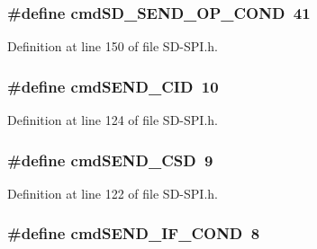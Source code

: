 \subsubsection[{cmd\+S\+D\+\_\+\+S\+E\+N\+D\+\_\+\+O\+P\+\_\+\+C\+O\+N\+D}]{\setlength{\rightskip}{0pt plus 5cm}\#define cmd\+S\+D\+\_\+\+S\+E\+N\+D\+\_\+\+O\+P\+\_\+\+C\+O\+N\+D~41}\label{_s_d-_s_p_i_8h_a1823d137ba816c2789769b7237e92aa8}


Definition at line 150 of file S\+D-\/\+S\+P\+I.\+h.

\hypertarget{_s_d-_s_p_i_8h_ad780cd6b5490b6d4a1252a8412910bc3}{}
\subsubsection[{cmd\+S\+E\+N\+D\+\_\+\+C\+I\+D}]{\setlength{\rightskip}{0pt plus 5cm}\#define cmd\+S\+E\+N\+D\+\_\+\+C\+I\+D~10}\label{_s_d-_s_p_i_8h_ad780cd6b5490b6d4a1252a8412910bc3}


Definition at line 124 of file S\+D-\/\+S\+P\+I.\+h.

\hypertarget{_s_d-_s_p_i_8h_a6909d22ca448c3785d1c65b31d93f205}{}
\subsubsection[{cmd\+S\+E\+N\+D\+\_\+\+C\+S\+D}]{\setlength{\rightskip}{0pt plus 5cm}\#define cmd\+S\+E\+N\+D\+\_\+\+C\+S\+D~9}\label{_s_d-_s_p_i_8h_a6909d22ca448c3785d1c65b31d93f205}


Definition at line 122 of file S\+D-\/\+S\+P\+I.\+h.

\hypertarget{_s_d-_s_p_i_8h_a6b12e0aa6067fd1100de3375a72918a6}{}
\subsubsection[{cmd\+S\+E\+N\+D\+\_\+\+I\+F\+\_\+\+C\+O\+N\+D}]{\setlength{\rightskip}{0pt plus 5cm}\#define cmd\+S\+E\+N\+D\+\_\+\+I\+F\+\_\+\+C\+O\+N\+D~8}\label{_s_d-_s_p_i_8h_a6b12e0aa6067fd1100de3375a72918a6}


